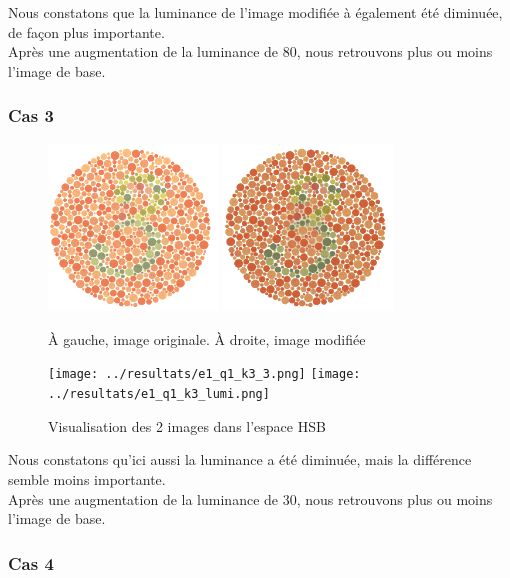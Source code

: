 \documentclass[a4paper]{article}
\begin{document}
Nous constatons que la luminance de l'image modifiée à également été diminuée, de façon plus importante.\\
Après une augmentation de la luminance de 80, nous retrouvons plus ou moins l'image de base.

\subsubsection{Cas 3}

\begin{figure}[H]
\begin{center}
\includegraphics[width=170px]{../base/cas_3_dalton3.png}
\includegraphics[width=170px]{../base/cas_3_luminance.png}
\end{center}
\caption{À gauche, image originale. À droite, image modifiée}
\end{figure}

\begin{figure}[H]
\begin{center}
\texttt{[image: ../resultats/e1\_q1\_k3\_3.png]}
\texttt{[image: ../resultats/e1\_q1\_k3\_lumi.png]}
\end{center}
\caption{Visualisation des 2 images dans l'espace HSB}
\end{figure}

Nous constatons qu'ici aussi la luminance a été diminuée, mais la différence semble moins importante.\\
Après une augmentation de la luminance de 30, nous retrouvons plus ou moins l'image de base.

\subsubsection{Cas 4}
\end{document}
